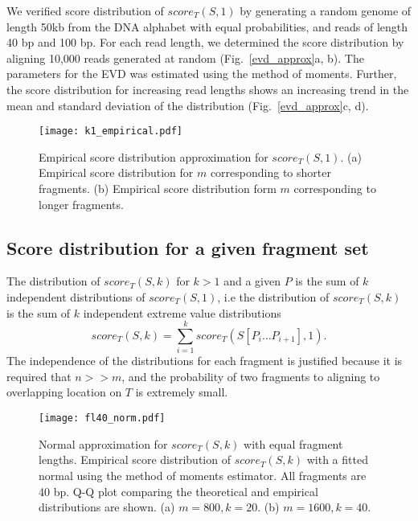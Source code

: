 We verified score distribution of $score_T(S,1)$ by generating a random
genome of length 50kb from the DNA alphabet with equal probabilities,
and reads of length 40 bp and 100 bp. For each read length, we
determined the score distribution by aligning 10,000 reads generated at
random (Fig.~\ref{evd_approx}a, b). The parameters for the EVD was
estimated using the method of moments.
Further, the score distribution for increasing read lengths shows an
increasing trend in the mean and standard deviation of the distribution
(Fig.~\ref{evd_approx}c, d).

\begin{figure}[t!]
\centering
\texttt{[image: k1\_empirical.pdf]}
\caption[Empirical score distribution for $score_T(S,1)$]{
  Empirical score distribution approximation for $score_T(S,1)$.
  (a) Empirical score distribution for $m$ corresponding to shorter
  fragments.
  (b) Empirical score distribution form $m$ corresponding to longer
  fragments.}
\label{evd_empirical}
\end{figure}


\subsection{Score distribution for a given fragment set}
The distribution of $score_T(S,k)$ for $k > 1$ and a given $P$ is the
sum of $k$ independent distributions of $score_T(S,1)$, i.e the
distribution of $score_T(S,k)$ is the sum of $k$ independent extreme
value distributions \[score_T(S,k) = \sum_{i=1}^{k} score_T(S[P_i \dots
P_{i+1}], 1).\]
The independence of the distributions for each fragment is justified
because it is required that $n >> m$, and the probability of two
fragments to aligning to overlapping location on $T$ is extremely small.

\begin{figure}[t!]
\centering
\texttt{[image: fl40\_norm.pdf]}
\caption[Normal approximation for $score_T(S,k)$ with equal fragment
  lengths]{
  Normal approximation for $score_T(S,k)$ with equal fragment lengths.
  Empirical score distribution of $score_T(S,k)$ with a fitted
  normal using the method of moments estimator. All fragments are 40 bp.
  Q-Q plot comparing the theoretical and empirical distributions are shown.
  (a) $m=800, k=20$.
  (b) $m=1600, k=40$.}
\label{norm_const}
\end{figure}

